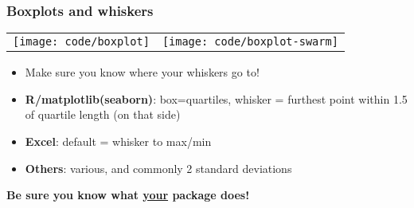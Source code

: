\documentclass{beamer}
\newcommand{\key}[1]{\textcolor{keyred}{{\bf #1}}}
\begin{document}
\begin{frame}
\frametitle{Boxplots and whiskers}
\begin{tabular}{@{}cc}
\begin{minipage}{0.5\textwidth}
\texttt{[image: code/boxplot]}
\end{minipage}&
\begin{minipage}{0.5\textwidth}
\texttt{[image: code/boxplot-swarm]}
\end{minipage}
\end{tabular}
\begin{itemize}
\item Make sure you know where your whiskers go to!
\item
\key{R/matplotlib(seaborn)}: box=quartiles, whisker = furthest point within 1.5 of quartile length (on that side)
\item
\key{Excel}: default = whisker to max/min
\item
\key{Others}: various, and commonly 2 standard deviations
%
\end{itemize}
\begin{center}
\key{Be sure you know what \underline{your} package does!}
\end{center}
\end{frame}

\end{document}
